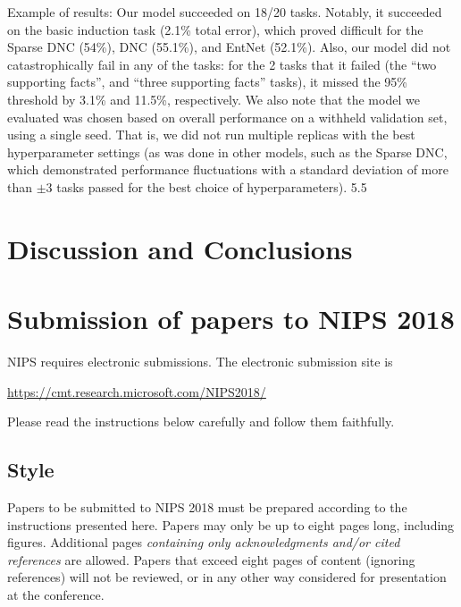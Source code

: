 \documentclass{article}
\begin{document}
Example of results:
Our model succeeded on 18/20 tasks. Notably, it succeeded on the basic induction task (2.1\% total error), which proved difficult for the Sparse DNC (54\%), DNC (55.1\%), and EntNet (52.1\%). Also, our model did not catastrophically fail in any of the tasks: for the 2 tasks that it failed (the “two supporting facts”, and “three supporting facts” tasks), it missed the 95\% threshold by 3.1\% and 11.5\%, respectively. We also note that the model we evaluated was chosen based on overall performance on a withheld validation set, using a single seed. That is, we did not run multiple replicas with the best hyperparameter settings (as was done in other models, such as the Sparse DNC, which demonstrated performance fluctuations with a standard deviation of more than $\pm 3$ tasks passed for the best choice of hyperparameters).
5.5


\section{Discussion and Conclusions}









\newpage

\section{Submission of papers to NIPS 2018}

NIPS requires electronic submissions.  The electronic submission site
is
\begin{center}
  \url{https://cmt.research.microsoft.com/NIPS2018/}
\end{center}

Please read the instructions below carefully and follow them faithfully.

\subsection{Style}

Papers to be submitted to NIPS 2018 must be prepared according to the
instructions presented here. Papers may only be up to eight pages
long, including figures. Additional pages \emph{containing only
  acknowledgments and/or cited references} are allowed. Papers that
exceed eight pages of content (ignoring references) will not be
reviewed, or in any other way considered for presentation at the
conference.
\end{document}
